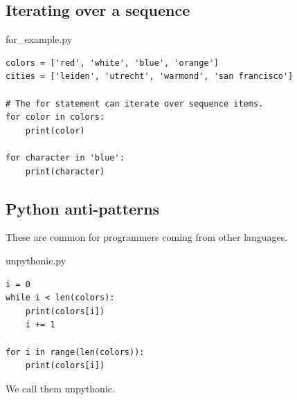 \documentclass[aspectratio=1610,slidestop]{beamer}
\begin{document}
\subsection{Iterating over a sequence}
\begin{pframe}
 \begin{pythonfile}{for\_example.py}
  \begin{verbatim}
colors = ['red', 'white', 'blue', 'orange']
cities = ['leiden', 'utrecht', 'warmond', 'san francisco']

# The for statement can iterate over sequence items.
for color in colors:
    print(color)

for character in 'blue':
    print(character)
  \end{verbatim}
 \end{pythonfile}
\end{pframe}

\begin{pframe}
 \begin{terminal}
 \end{terminal}
\end{pframe}


\subsection{Python anti-patterns}
\begin{pframe}
These are common for programmers coming from other languages.
 \begin{pythonfile}{unpythonic.py}
  \begin{verbatim}
i = 0
while i < len(colors):
    print(colors[i])
    i += 1

for i in range(len(colors)):
    print(colors[i])
  \end{verbatim}
 \end{pythonfile}

We call them unpythonic.
\end{pframe}
\end{document}
